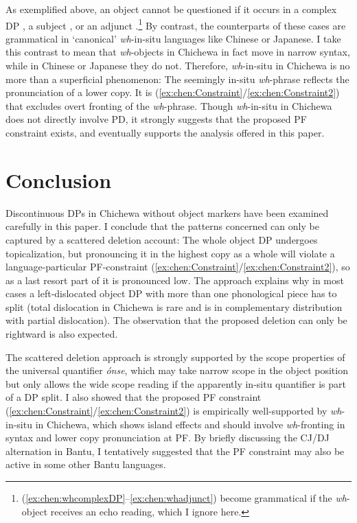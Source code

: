 \documentclass[output=paper,colorlinks,citecolor=brown
]{langscibook}
\begin{document}
 As exemplified above, an object cannot be questioned if it occurs in a complex DP , a subject , or an adjunct .\footnote{(\ref{ex:chen:whcomplexDP}--\ref{ex:chen:whadjunct}) become grammatical if the \textit{wh}-object receives an echo reading, which I ignore here.} By contrast, the counterparts of these cases are grammatical in `canonical' \textit{wh}-in-situ languages like Chinese or Japanese. I take this contrast to mean that \textit{wh}-objects in Chichewa in fact move in narrow syntax, while in Chinese or Japanese they do not. Therefore, \textit{wh}-in-situ in Chichewa is no more than a superficial phenomenon: The seemingly in-situ \textit{wh}-phrase reflects the pronunciation of a lower copy. It is (\ref{ex:chen:Constraint}/\ref{ex:chen:Constraint2}) that excludes overt fronting of the \textit{wh}-phrase. Though \textit{wh}-in-situ in Chichewa does not directly involve PD, it strongly suggests that the proposed PF constraint exists, and eventually supports the analysis offered in this paper.

\section{Conclusion}\label{sec:chen:6}

Discontinuous DPs in Chichewa without object markers have been examined carefully in this paper. I conclude that the patterns concerned can only be captured by a scattered deletion account: The whole object DP undergoes topicalization, but pronouncing it in the highest copy as a whole will violate a language-particular PF-constraint (\ref{ex:chen:Constraint}/\ref{ex:chen:Constraint2}), so as a last resort part of it is pronounced low. The approach explains why in most cases a left-dislocated object DP with more than one phonological piece has to split (total dislocation in Chichewa is rare and is in complementary distribution with partial dislocation). The observation that the proposed deletion can only be rightward is also expected.

The scattered deletion approach is strongly supported by the scope properties of the universal quantifier \textit{\'{o}nse}, which may take narrow scope in the object position but only allows the wide scope reading if the apparently in-situ quantifier is part of a DP split. I also showed that the proposed PF constraint (\ref{ex:chen:Constraint}/\ref{ex:chen:Constraint2}) is empirically well-supported by \textit{wh}-in-situ in Chichewa, which shows island effects and should involve \textit{wh}-fronting in syntax and lower copy pronunciation at PF. By briefly discussing the CJ/DJ alternation in Bantu, I tentatively suggested that the PF constraint may also be active in some other Bantu languages.
\end{document}

